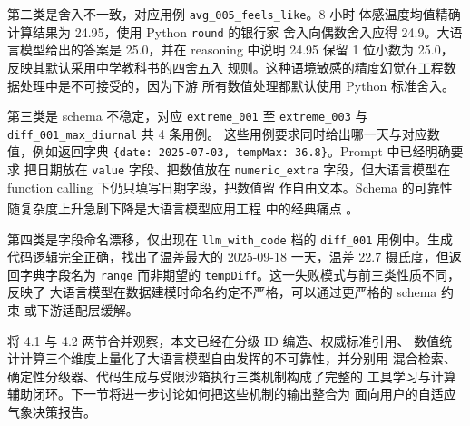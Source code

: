 \documentclass[a4paper]{article}
\theoremstyle{definition}
\theoremstyle{plain}
\theoremstyle{remark}
\let\oldcite\cite
\renewcommand{\cite}[1]{\textsuperscript{\oldcite{#1}}}
\newcommand{\bk}{\discretionary{}{}{}}
\begin{document}
第二类是舍入不一致，对应用例 \texttt{avg\_\bk{}005\_\bk{}feels\_\bk{}like}。8 小时
体感温度均值精确计算结果为 24.95，使用 Python \texttt{round} 的银行家
舍入向偶数舍入应得 24.9。大语言模型给出的答案是 25.0，并在 reasoning
中说明 24.95 保留 1 位小数为 25.0，反映其默认采用中学教科书的四舍五入
规则。这种语境敏感的精度幻觉在工程数据处理中是不可接受的，因为下游
所有数值处理都默认使用 Python 标准舍入。

第三类是 schema 不稳定，对应 \texttt{extreme\_\bk{}001} 至
\texttt{extreme\_\bk{}003} 与 \texttt{diff\_\bk{}001\_\bk{}max\_\bk{}diurnal} 共 4 条用例。
这些用例要求同时给出哪一天与对应数值，例如返回字典
\texttt{\{date: 2025-07-03, tempMax: 36.8\}}。Prompt 中已经明确要求
把日期放在 \texttt{value} 字段、把数值放在 \texttt{numeric\_\bk{}extra}
字段，但大语言模型在 function calling 下仍只填写日期字段，把数值留
作自由文本。Schema 的可靠性随复杂度上升急剧下降是大语言模型应用工程
中的经典痛点 \cite{ref22}。

第四类是字段命名漂移，仅出现在 \texttt{llm\_\bk{}with\_\bk{}code} 档的
\texttt{diff\_\bk{}001} 用例中。生成代码逻辑完全正确，找出了温差最大的
2025-09-18 一天，温差 22.7 摄氏度，但返回字典字段名为 \texttt{range}
而非期望的 \texttt{tempDiff}。这一失败模式与前三类性质不同，反映了
大语言模型在数据建模时命名约定不严格，可以通过更严格的 schema 约束
或下游适配层缓解。

将 4.1 与 4.2 两节合并观察，本文已经在分级 ID 编造、权威标准引用、
数值统计计算三个维度上量化了大语言模型自由发挥的不可靠性，并分别用
混合检索、确定性分级器、代码生成与受限沙箱执行三类机制构成了完整的
工具学习与计算辅助闭环。下一节将进一步讨论如何把这些机制的输出整合为
面向用户的自适应气象决策报告。

\end{document}
